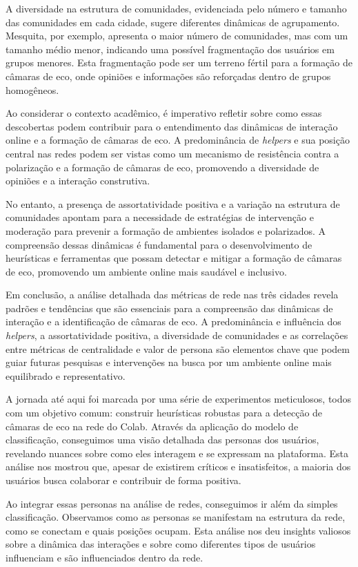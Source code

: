 A diversidade na estrutura de comunidades, evidenciada pelo número e tamanho das comunidades em cada cidade, sugere diferentes dinâmicas de agrupamento. Mesquita, por exemplo, apresenta o maior número de comunidades, mas com um tamanho médio menor, indicando uma possível fragmentação dos usuários em grupos menores. Esta fragmentação pode ser um terreno fértil para a formação de câmaras de eco, onde opiniões e informações são reforçadas dentro de grupos homogêneos.

Ao considerar o contexto acadêmico, é imperativo refletir sobre como essas descobertas podem contribuir para o entendimento das dinâmicas de interação online e a formação de câmaras de eco. A predominância de \textit{helpers} e sua posição central nas redes podem ser vistas como um mecanismo de resistência contra a polarização e a formação de câmaras de eco, promovendo a diversidade de opiniões e a interação construtiva.

No entanto, a presença de assortatividade positiva e a variação na estrutura de comunidades apontam para a necessidade de estratégias de intervenção e moderação para prevenir a formação de ambientes isolados e polarizados. A compreensão dessas dinâmicas é fundamental para o desenvolvimento de heurísticas e ferramentas que possam detectar e mitigar a formação de câmaras de eco, promovendo um ambiente online mais saudável e inclusivo.

Em conclusão, a análise detalhada das métricas de rede nas três cidades revela padrões e tendências que são essenciais para a compreensão das dinâmicas de interação e a identificação de câmaras de eco. A predominância e influência dos \textit{helpers}, a assortatividade positiva, a diversidade de comunidades e as correlações entre métricas de centralidade e valor de persona são elementos chave que podem guiar futuras pesquisas e intervenções na busca por um ambiente online mais equilibrado e representativo.

A jornada até aqui foi marcada por uma série de experimentos meticulosos, todos com um objetivo comum: construir heurísticas robustas para a detecção de câmaras de eco na rede do Colab. Através da aplicação do modelo de classificação, conseguimos uma visão detalhada das personas dos usuários, revelando nuances sobre como eles interagem e se expressam na plataforma. Esta análise nos mostrou que, apesar de existirem críticos e insatisfeitos, a maioria dos usuários busca colaborar e contribuir de forma positiva.

Ao integrar essas personas na análise de redes, conseguimos ir além da simples classificação. Observamos como as personas se manifestam na estrutura da rede, como se conectam e quais posições ocupam. Esta análise nos deu insights valiosos sobre a dinâmica das interações e sobre como diferentes tipos de usuários influenciam e são influenciados dentro da rede.

